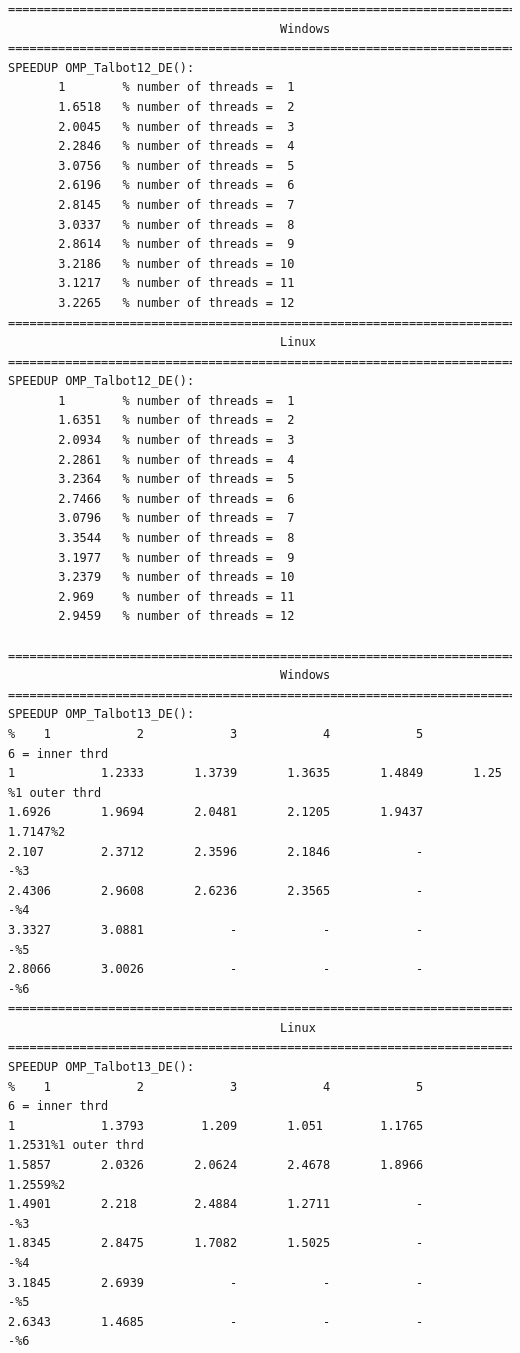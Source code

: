 \documentclass[a4paper,10pt]{report}%
\begin{document}
\begin{lstlisting}
====================================================================================
                                      Windows
====================================================================================
SPEEDUP OMP_Talbot12_DE():
       1        % number of threads =  1
       1.6518   % number of threads =  2
       2.0045   % number of threads =  3
       2.2846   % number of threads =  4
       3.0756   % number of threads =  5
       2.6196   % number of threads =  6
       2.8145   % number of threads =  7
       3.0337   % number of threads =  8
       2.8614   % number of threads =  9
       3.2186   % number of threads = 10
       3.1217   % number of threads = 11
       3.2265   % number of threads = 12
====================================================================================
                                      Linux
====================================================================================
SPEEDUP OMP_Talbot12_DE():
       1        % number of threads =  1
       1.6351   % number of threads =  2
       2.0934   % number of threads =  3
       2.2861   % number of threads =  4
       3.2364   % number of threads =  5
       2.7466   % number of threads =  6
       3.0796   % number of threads =  7
       3.3544   % number of threads =  8
       3.1977   % number of threads =  9
       3.2379   % number of threads = 10
       2.969    % number of threads = 11
       2.9459   % number of threads = 12

====================================================================================
                                      Windows
====================================================================================
SPEEDUP OMP_Talbot13_DE():
%    1            2            3            4            5            6 = inner thrd
1            1.2333       1.3739       1.3635       1.4849       1.25  %1 outer thrd
1.6926       1.9694       2.0481       2.1205       1.9437       1.7147%2
2.107        2.3712       2.3596       2.1846            -            -%3
2.4306       2.9608       2.6236       2.3565            -            -%4
3.3327       3.0881            -            -            -            -%5
2.8066       3.0026            -            -            -            -%6
====================================================================================
                                      Linux
====================================================================================
SPEEDUP OMP_Talbot13_DE():
%    1            2            3            4            5            6 = inner thrd
1            1.3793        1.209       1.051        1.1765       1.2531%1 outer thrd
1.5857       2.0326       2.0624       2.4678       1.8966       1.2559%2
1.4901       2.218        2.4884       1.2711            -            -%3
1.8345       2.8475       1.7082       1.5025            -            -%4
3.1845       2.6939            -            -            -            -%5
2.6343       1.4685            -            -            -            -%6
\end{lstlisting}
\end{document}
